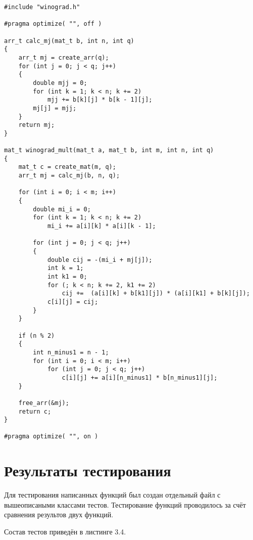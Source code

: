 \begin{lstlisting}[caption = Оптимизированая функция умножения матриц алгоритмом Винограда.]
#include "winograd.h"

#pragma optimize( "", off )

arr_t calc_mj(mat_t b, int n, int q)
{
	arr_t mj = create_arr(q);
	for (int j = 0; j < q; j++)
	{
		double mjj = 0; 
		for (int k = 1; k < n; k += 2)
			mjj += b[k][j] * b[k - 1][j];
		mj[j] = mjj;
	}
	return mj;
}

mat_t winograd_mult(mat_t a, mat_t b, int m, int n, int q)
{
	mat_t c = create_mat(m, q);
	arr_t mj = calc_mj(b, n, q);
	
	for (int i = 0; i < m; i++)
	{
		double mi_i = 0;
		for (int k = 1; k < n; k += 2)
			mi_i += a[i][k] * a[i][k - 1];
		
		for (int j = 0; j < q; j++)
		{
			double cij = -(mi_i + mj[j]);
			int k = 1;
			int k1 = 0;
			for (; k < n; k += 2, k1 += 2)
				cij +=	(a[i][k] + b[k1][j]) * (a[i][k1] + b[k][j]);
			c[i][j] = cij;
		}
	}
	
	if (n % 2)
	{
		int n_minus1 = n - 1;
		for (int i = 0; i < m; i++)
			for (int j = 0; j < q; j++)
				c[i][j] += a[i][n_minus1] * b[n_minus1][j];
	}
	
	free_arr(&mj);
	return c;
}

#pragma optimize( "", on )
\end{lstlisting}


\section{Результаты тестирования}
Для тестирования написанных функций был создан отдельный файл с вышеописаными классами тестов. Тестирование функций проводилось за счёт сравнения результов двух функций.

Состав тестов приведён в листинге 3.4.

